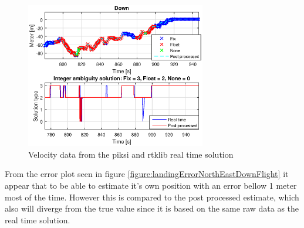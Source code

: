 \begin{figure}[H]
	\centering
		\includegraphics[width=0.7\textwidth]{figs/plots/landingDownFlight.eps}
		\caption{Velocity data from the piksi and rtklib real time solution}
		\label{figure:landingDownFlight}
\end{figure}

From the error plot seen in figure \ref{figure:landingErrorNorthEastDownFlight} it appear that to be able to estimate it's own position with an error bellow 1 meter most of the time. However this is compared to the post processed estimate, which also will diverge from the true value since it is based on the same raw data as the real time solution.

